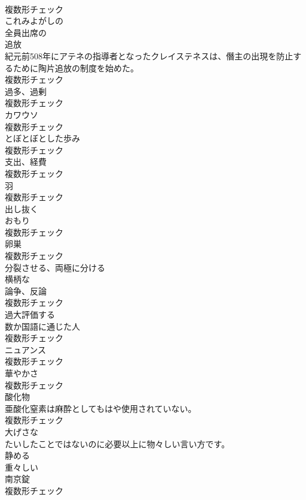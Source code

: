 \documentclass[8pt]{extreport}
\begin{document}
\begin{CJK}{UTF8}{min}
\\	複数形チェック
\\	[形容詞]	これみよがしの	
\\	[形容詞]	全員出席の	
\\	[名詞]	追放	
\\	紀元前508年にアテネの指導者となったクレイステネスは、僭主の出現を防止するために陶片追放の制度を始めた。	
\\	複数形チェック
\\	[名詞]	過多、過剰	
\\	複数形チェック
\\	[名詞]	カワウソ	
\\	複数形チェック
\\	[名詞]	とぼとぼとした歩み	
\\	複数形チェック
\\	[名詞]	支出、経費	
\\	複数形チェック
\\	[名詞]	羽	
\\	複数形チェック
\\	[動詞]	出し抜く	
\\	[名詞]	おもり	
\\	複数形チェック
\\	[名詞]	卵巣	
\\	複数形チェック
\\	[動詞]	分裂させる、両極に分ける	
\\	[形容詞]	横柄な	
\\	[名詞]	論争、反論	
\\	複数形チェック
\\	[動詞]	過大評価する	
\\	[名詞]	数か国語に通じた人	
\\	複数形チェック
\\	[名詞]	ニュアンス	
\\	複数形チェック
\\	[名詞]	華やかさ	
\\	複数形チェック
\\	[名詞]	酸化物	
\\	亜酸化窒素は麻酔としてもはや使用されていない。	
\\	複数形チェック
\\	[形容詞]	大げさな	
\\	たいしたことではないのに必要以上に物々しい言い方です。	
\\	[動詞]	静める	
\\	[形容詞]	重々しい	
\\	[名詞]	南京錠	
\\	複数形チェック

\end{CJK}
\end{document}
